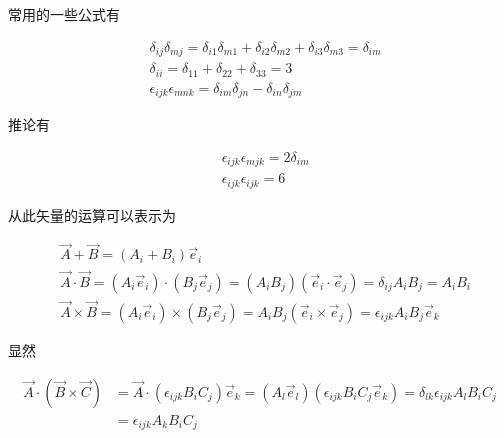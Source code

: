 常用的一些公式有

\begin{equation*}
  \begin{aligned}
    & \delta_{ij} \delta_{mj} = \delta_{i1} \delta_{m1} + \delta_{i2} \delta_{m2} + \delta_{i3} \delta_{m3} = \delta_{im} \\
    & \delta_{ii} = \delta_{11} + \delta_{22} + \delta_{33} = 3 \\
    & \epsilon_{ijk} \epsilon_{mnk} = \delta_{im} \delta_{jn} - \delta_{in} \delta_{jm}
  \end{aligned}
\end{equation*}

推论有

\begin{equation*}
  \begin{aligned}
    & \epsilon_{ijk} \epsilon_{mjk} = 2 \delta_{im} \\
    & \epsilon_{ijk} \epsilon_{ijk} = 6
  \end{aligned}
\end{equation*}

从此矢量的运算可以表示为

\begin{equation*}
  \begin{aligned}
    & \vec{A} + \vec{B} = \left( A_i + B_i \right) \vec{e}_i \\
    & \vec{A} \cdot \vec{B} = \left( A_i \vec{e}_i \right) \cdot \left( B_j \vec{e}_j \right) = \left( A_i B_j \right) \left( \vec{e}_i \cdot \vec{e}_j \right) = \delta_{ij} A_i B_j = A_i B_i \\
    & \vec{A} \times \vec{B} = \left( A_i \vec{e}_i \right) \times \left( B_j \vec{e}_j \right) = A_i B_j \left( \vec{e}_i \times \vec{e}_j \right) = \epsilon_{ijk} A_i B_j \vec{e}_k
  \end{aligned}
\end{equation*}

显然

\begin{equation*}
  \begin{aligned}
    \vec{A} \cdot \left( \vec{B} \times \vec{C} \right) &= \vec{A} \cdot \left( \epsilon_{ijk} B_i C_j \right) \vec{e}_k = \left( A_l \vec{e}_l \right) \left( \epsilon_{ijk} B_i C_j \vec{e}_k \right) = \delta_{lk} \epsilon_{ijk} A_l B_i C_j \\
    &= \epsilon_{ijk} A_k B_i C_j
  \end{aligned}
\end{equation*}


